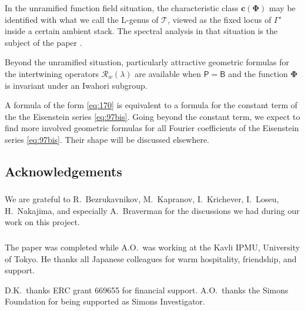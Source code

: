 \documentclass[14pt]{extarticle}
\newcommand{\sP}{\mathsf{P}}
\newcommand{\bB}{\mathsf{B}}
\newcommand{\bX}{\mathsf{X}}
\newcommand{\cT}{\mathscr{T}}
\newcommand{\cR}{\mathscr{R}}
\newcommand{\bbc}{\mathbf{c}}
\newcommand{\bPhi}{\boldsymbol{\Phi}}
\theoremstyle{definition}
\begin{document}
In the unramified function field situation, the characteristic class
$\bbc(\bPhi)$ may be identified with what we call the L-genus
\cite{KO} of $\cT$, viewed as the fixed locus of $\Gamma'$ inside
a certain ambient stack. The spectral analysis in that situation is
the subject of the paper \cite{KO2}.

Beyond the unramified situation, particularly
attractive geometric formulas for the intertwining operators
$\cR_w(\lambda)$ are available when $\sP=\bB$ and the
function $\bPhi$ is invariant under an Iwahori subgroup.


A formula of the form \eqref{eq:170} is equivalent to a formula for the constant 
term of the the Eisenstein series
\eqref{eq:97bis}.  
Going beyond the constant term, we expect to find more involved
geometric formulas for all Fourier coefficients of the Eisenstein series
\eqref{eq:97bis}.  Their shape will be discussed elsewhere. 





\subsection{Acknowledgements}

\subsubsection{}

We are grateful to R.~Bezrukavnikov, M.~Kapranov, I.~Krichever,
I.~Loseu, H.~Nakajima, and especially A.~Braverman for the discussions
we had during our work on this project. 

\subsubsection{}

 The paper was
completed while A.O.\ was working at the Kavli IPMU, University of
Tokyo. He  thanks all Japanese colleagues for warm hospitality,
friendship,
and support.

D.K.\ thanks ERC grant 669655 for financial support. A.O.\ thanks
the Simons Foundation for being supported as Simons Investigator. 





\end{document}
